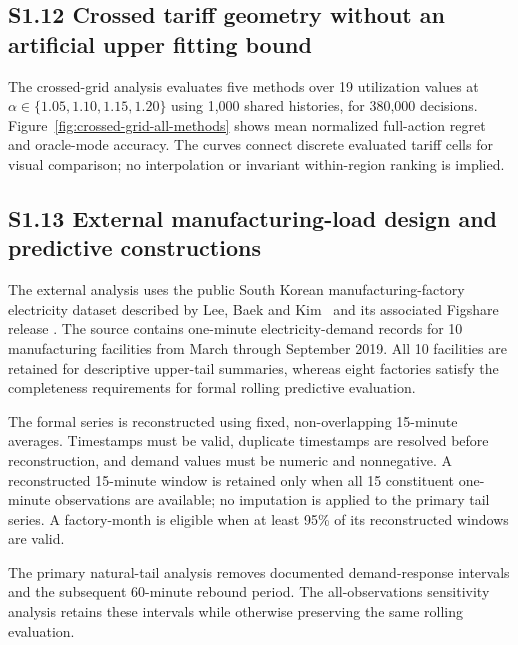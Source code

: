 \documentclass[AMA,Times1COL]{WileyNJDv5}
\begin{document}

\subsection*{S1.12 Crossed tariff geometry without an artificial upper fitting bound}

The crossed-grid analysis evaluates five methods over 19 utilization
values at $\alpha\in\{1.05,1.10,1.15,1.20\}$ using 1,000 shared
histories, for 380,000 decisions. Figure~\ref{fig:crossed-grid-all-methods}
shows mean normalized full-action regret and oracle-mode accuracy. The
curves connect discrete evaluated tariff cells for visual comparison;
no interpolation or invariant within-region ranking is implied.


\subsection*{S1.13 External manufacturing-load design and predictive constructions}

The external analysis uses the public South Korean
manufacturing-factory electricity dataset described by Lee, Baek and
Kim~\cite{Lee2022} and its associated Figshare release
\cite{LeeFigshare}. The source contains one-minute electricity-demand
records for 10 manufacturing facilities from March through September
2019. All 10 facilities are retained for descriptive upper-tail
summaries, whereas eight factories satisfy the completeness
requirements for formal rolling predictive evaluation.

The formal series is reconstructed using fixed, non-overlapping
15-minute averages. Timestamps must be valid, duplicate timestamps are
resolved before reconstruction, and demand values must be numeric and
nonnegative. A reconstructed 15-minute window is retained only when
all 15 constituent one-minute observations are available; no
imputation is applied to the primary tail series. A factory-month is
eligible when at least 95\% of its reconstructed windows are valid.

The primary natural-tail analysis removes documented demand-response
intervals and the subsequent 60-minute rebound period. The
all-observations sensitivity analysis retains these intervals while
otherwise preserving the same rolling evaluation.
\end{document}
